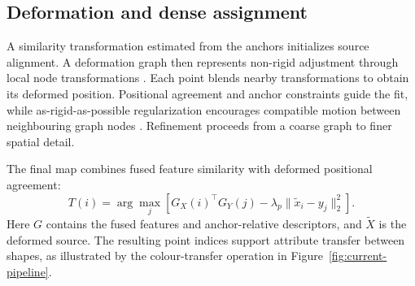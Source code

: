 \subsection{Deformation and dense assignment}
A similarity transformation estimated from the anchors initializes source alignment. A deformation graph then represents non-rigid adjustment through local node transformations \citep{10.1145/1275808.1276478}. Each point blends nearby transformations to obtain its deformed position. Positional agreement and anchor constraints guide the fit, while as-rigid-as-possible regularization encourages compatible motion between neighbouring graph nodes \citep{sorkine2007rigid}. Refinement proceeds from a coarse graph to finer spatial detail.

The final map combines fused feature similarity with deformed positional agreement:
\begin{equation}
 T(i)=\arg\max_j\left[G_X(i)^\top G_Y(j)
 -\lambda_p\|\widetilde x_i-y_j\|_2^2\right].
\end{equation}
Here $G$ contains the fused features and anchor-relative descriptors, and $\widetilde X$ is the deformed source. The resulting point indices support attribute transfer between shapes, as illustrated by the colour-transfer operation in Figure~\ref{fig:current-pipeline}.
